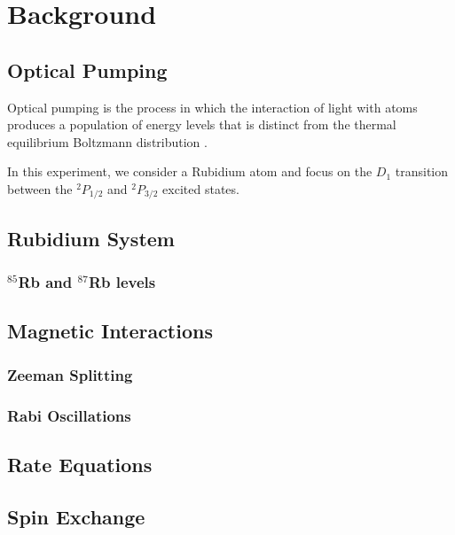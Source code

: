 
\section{Background}\label{background}

\subsection{Optical Pumping}

Optical pumping is the process in which the interaction of light with
atoms produces a population of energy levels that is distinct from the
thermal equilibrium Boltzmann distribution \cite{bernheim}.

In this experiment, we consider a Rubidium atom and focus on the $D_1$
transition between the $^2P_{1/2}$ and $^2P_{3/2}$ excited states.

\subsection{Rubidium System}

\subsubsection{$^{85}$Rb and $^{87}$Rb levels}

\subsection{Magnetic Interactions}

\subsubsection{Zeeman Splitting}

\subsubsection{Rabi Oscillations}

\subsection{Rate Equations}


\subsection{Spin Exchange}